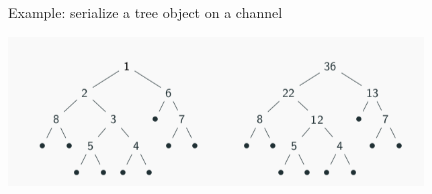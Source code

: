 \documentclass[10pt]{beamer}
\begin{document}
\begin{frame}[fragile]{Example:  serialize a tree object on a channel \hfill {}}

\includegraphics[width=11cm]{img/treesum}


\end{frame}
\end{document}
